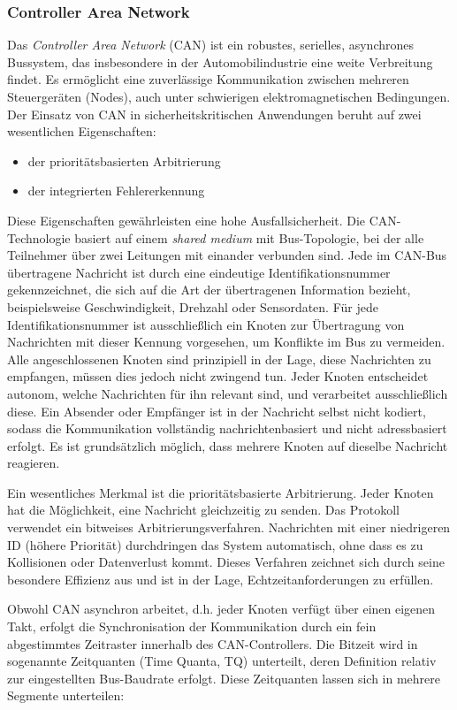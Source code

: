 \subsubsection*{Controller Area Network}
Das \emph{Controller Area Network} (CAN) ist ein robustes, serielles, asynchrones Bussystem, das insbesondere in der Automobilindustrie eine weite Verbreitung findet. 
Es ermöglicht eine zuverlässige Kommunikation zwischen mehreren Steuergeräten (Nodes), auch unter schwierigen elektromagnetischen Bedingungen. 
Der Einsatz von CAN in sicherheitskritischen Anwendungen beruht auf zwei wesentlichen Eigenschaften: 
\begin{itemize}
	\item der prioritätsbasierten Arbitrierung
	\item der integrierten Fehlererkennung
\end{itemize}
 
Diese Eigenschaften gewährleisten eine hohe Ausfallsicherheit.
Die CAN-Technologie basiert auf einem \emph{shared medium} mit Bus-Topologie, bei der alle Teilnehmer über zwei Leitungen mit einander verbunden sind.
Jede im CAN-Bus übertragene Nachricht ist durch eine eindeutige Identifikationsnummer gekennzeichnet, die sich auf die Art der übertragenen Information bezieht, beispielsweise Geschwindigkeit, Drehzahl oder Sensordaten. 
Für jede Identifikationsnummer ist ausschließlich ein Knoten zur Übertragung von Nachrichten mit dieser Kennung vorgesehen, um Konflikte im Bus zu vermeiden. 
Alle angeschlossenen Knoten sind prinzipiell in der Lage, diese Nachrichten zu empfangen, müssen dies jedoch nicht zwingend tun. 
Jeder Knoten entscheidet autonom, welche Nachrichten für ihn relevant sind, und verarbeitet ausschließlich diese. 
Ein Absender oder Empfänger ist in der Nachricht selbst nicht kodiert, sodass die Kommunikation vollständig nachrichtenbasiert und nicht adressbasiert erfolgt.
Es ist grundsätzlich möglich, dass mehrere Knoten auf dieselbe Nachricht reagieren.

Ein wesentliches Merkmal ist die prioritätsbasierte Arbitrierung. 
Jeder Knoten hat die Möglichkeit, eine Nachricht gleichzeitig zu senden. 
Das Protokoll verwendet ein bitweises Arbitrierungsverfahren. 
Nachrichten mit einer niedrigeren ID (höhere Priorität) durchdringen das System automatisch, ohne dass es zu Kollisionen oder Datenverlust kommt.
Dieses Verfahren zeichnet sich durch seine besondere Effizienz aus und ist in der Lage, Echtzeitanforderungen zu erfüllen.

Obwohl CAN asynchron arbeitet, d.h. jeder Knoten verfügt über einen eigenen Takt, erfolgt die Synchronisation der Kommunikation durch ein fein abgestimmtes Zeitraster innerhalb des CAN-Controllers. 
Die Bitzeit wird in sogenannte Zeitquanten (Time Quanta, TQ) unterteilt, deren Definition relativ zur eingestellten Bus-Baudrate erfolgt. 
Diese Zeitquanten lassen sich in mehrere Segmente unterteilen: 

